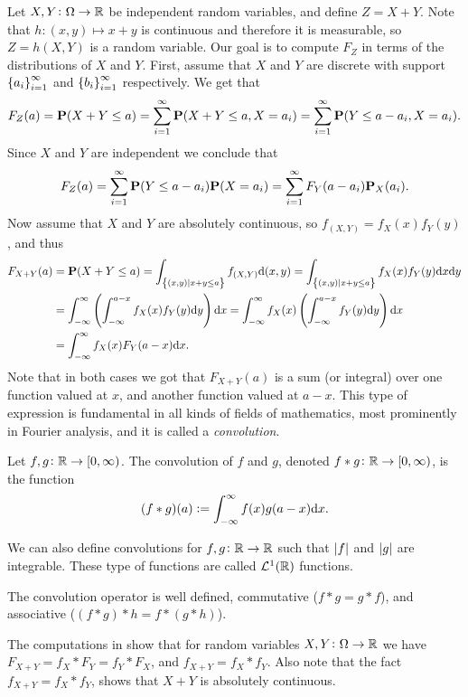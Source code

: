 \documentclass[11pt,a4paper]{article}
\begin{document}
\begin{example}
  \label{exmp:sum-of-rv}
  Let $X,Y \colon \Omega \to \mathbb{R}$ be independent random variables,
  and define $Z = X + Y$.
  Note that $h \colon (x,y) \mapsto x + y$ is continuous
  and therefore it is measurable, so $Z = h(X,Y)$ is a random variable.
  Our goal is to compute $F_Z$ in terms of the distributions of $X$
  and $Y$.
  First, assume that $X$ and $Y$ are discrete with
  support $\left\{a_i\right\}_{i=1}^{\infty}$ and $\left\{b_i\right\}_{i=1}^{\infty}$
  respectively.
  We get that
  \[
    F_{Z}(a) =
    \mathbf{P}(X + Y \le a) =
    \sum_{i=1}^{\infty} \mathbf{P}(X + Y \le a, X = a_i) =
    \sum_{i=1}^{\infty} \mathbf{P}(Y \le a - a_i, X = a_i).
  \]
  Since $X$ and $Y$ are independent we conclude that
  \[
    F_{Z}(a) =
    \sum_{i=1}^{\infty} \mathbf{P}(Y \le a - a_i) \mathbf{P}(X = a_i) =
    \sum_{i=1}^{\infty} F_Y(a - a_i) \mathbf{P}_X(a_i).
  \]
  Now assume that $X$ and $Y$ are absolutely continuous,
  so $f_{(X,Y)} = f_X(x) f_Y(y)$, and thus
  \begin{align*}
    F_{X+Y}(a) &=
    \Prob(X + Y \le a) =
    \int_{\set{(x,y) \mid x + y \le a}} f_{(X,Y)} \dif (x,y) =
    \int_{\set{(x,y) \mid x + y \le a}} f_X(x) f_Y(y) \dx\dy\\ &=
    \int_{-\infty}^{\infty} \del{ \int_{-\infty}^{a - x}
      f_X(x) f_Y(y) \dy} \dx =
    \int_{-\infty}^{\infty} f_X(x) \del{ \int_{-\infty}^{a - x}
      f_Y(y) \dy} \dx \\ &=
    \int_{-\infty}^{\infty} f_X(x) F_Y(a - x) \dx.
  \end{align*}
  Note that in both cases we got that $F_{X+Y}(a)$
  is a sum (or integral) over one function valued at $x$,
  and another function valued at $a - x$.
  This type of expression is fundamental in all kinds
  of fields of mathematics, most prominently in Fourier analysis,
  and it is called a \textit{convolution}.
\end{example}

\begin{definition}[Convolution]
  Let $f,g \colon \mathbb{R} \to [0,\infty)$.
  The convolution of $f$ and $g$, denoted
  $f * g \colon \mathbb{R} \to [0,\infty)$,
  is the function
  \[
    (f * g)(a) := \int_{-\infty}^{\infty} f(x) g(a - x) \dx.
  \]
\end{definition}
\begin{remark}
  We can also define convolutions for $f,g \colon \mathbb{R} \to \mathbb{R}$
  such that $\left\lvert f\right\rvert$ and $\left\lvert g\right\rvert$ are integrable.
  These type of functions are called $\mathcal L^1(\mathbb{R})$ functions.
\end{remark}
\begin{remark}
  The convolution operator is well defined,
  commutative ($f * g = g * f$),
  and associative ($(f * g) * h = f * (g * h)$).
\end{remark}
\begin{remark}
  The computations in  show
  that for random variables $X,Y \colon \Omega \to \mathbb{R}$
  we have $F_{X+Y} = f_X * F_Y = f_Y * F_X$,
  and $f_{X+Y} = f_X * f_Y$. 
  Also note that the fact $f_{X+Y} = f_X * f_Y$,
  shows that $X+Y$ is absolutely continuous.
\end{remark}
\end{document}
